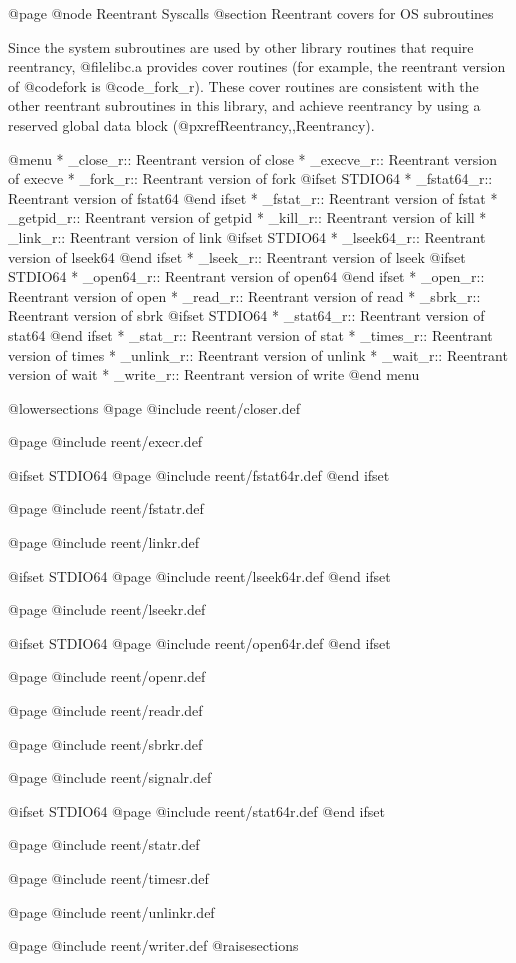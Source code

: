 @page
@node Reentrant Syscalls
@section Reentrant covers for OS subroutines

Since the system subroutines are used by other library routines that
require reentrancy, @file{libc.a} provides cover routines (for example,
the reentrant version of @code{fork} is @code{_fork_r}).  These cover
routines are consistent with the other reentrant subroutines in this
library, and achieve reentrancy by using a reserved global data block
(@pxref{Reentrancy,,Reentrancy}).

@menu
* _close_r::	Reentrant version of close
* _execve_r::	Reentrant version of execve
* _fork_r::	Reentrant version of fork
@ifset STDIO64
* _fstat64_r::	Reentrant version of fstat64
@end ifset
* _fstat_r::	Reentrant version of fstat
* _getpid_r::	Reentrant version of getpid
* _kill_r::	Reentrant version of kill
* _link_r::	Reentrant version of link
@ifset STDIO64
* _lseek64_r::	Reentrant version of lseek64
@end ifset
* _lseek_r::	Reentrant version of lseek
@ifset STDIO64
* _open64_r::	Reentrant version of open64
@end ifset
* _open_r::	Reentrant version of open
* _read_r::	Reentrant version of read
* _sbrk_r::	Reentrant version of sbrk
@ifset STDIO64
* _stat64_r::	Reentrant version of stat64
@end ifset
* _stat_r::	Reentrant version of stat
* _times_r::	Reentrant version of times
* _unlink_r::	Reentrant version of unlink
* _wait_r::	Reentrant version of wait
* _write_r::	Reentrant version of write
@end menu

@lowersections
@page
@include reent/closer.def

@page
@include reent/execr.def

@ifset STDIO64
@page
@include reent/fstat64r.def
@end ifset

@page
@include reent/fstatr.def

@page
@include reent/linkr.def

@ifset STDIO64
@page
@include reent/lseek64r.def
@end ifset

@page
@include reent/lseekr.def

@ifset STDIO64
@page
@include reent/open64r.def
@end ifset

@page
@include reent/openr.def

@page
@include reent/readr.def

@page
@include reent/sbrkr.def

@page
@include reent/signalr.def

@ifset STDIO64
@page
@include reent/stat64r.def
@end ifset

@page
@include reent/statr.def

@page
@include reent/timesr.def

@page
@include reent/unlinkr.def

@page
@include reent/writer.def
@raisesections
